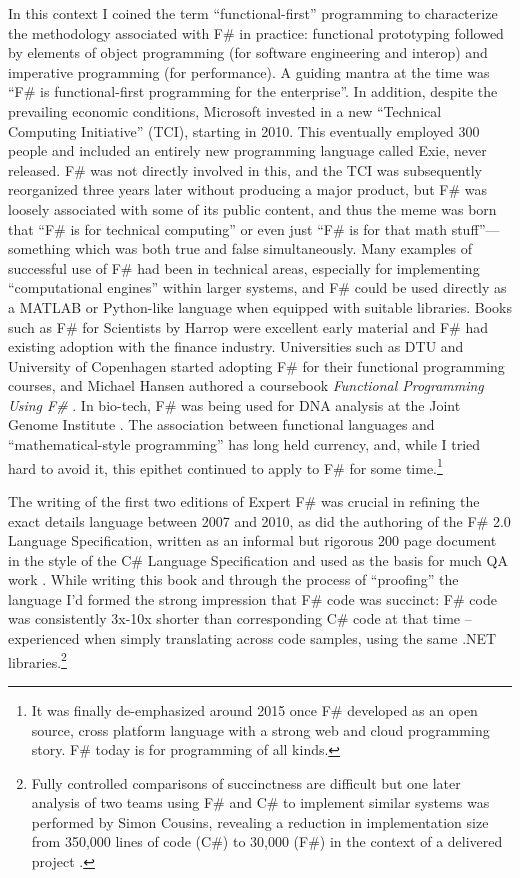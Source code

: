 \documentclass[acmsmall,screen]{acmart}
\begin{document}
In this context I coined the term “functional-first” programming to characterize the methodology associated with F\# in practice: functional prototyping
followed by elements of object programming (for software engineering and interop) and imperative programming (for performance). A guiding mantra
at the time was “F\# is functional-first programming for the enterprise”.  In addition, despite the prevailing economic conditions, Microsoft invested in a
new “Technical Computing Initiative” (TCI), starting in 2010. This eventually employed 300 people and included an entirely new programming language
called Exie, never released.  F\# was not directly involved in this, and the TCI was subsequently reorganized three years later without producing a major
product, but F\# was loosely associated with some of its public content, and thus the meme was born that “F\# is for technical computing” or even
just “F\# is for that math stuff”---something which was both true and false simultaneously. Many examples of successful use of F\# had been in
technical areas, especially for implementing “computational engines” within larger systems, and F\# could be used directly as a MATLAB or Python-like
language when equipped with suitable libraries.  Books such as F\# for Scientists by Harrop were excellent early material and F\# had existing adoption
with the finance industry. Universities such as DTU and University of Copenhagen started adopting F\# for their functional programming courses,
and Michael Hansen authored a coursebook \textit{Functional Programming Using F\#} \citep{Hansen2011}.
In bio-tech, F\# was being used for DNA analysis at the Joint Genome
Institute \citep{RefNeanderthals}.  The association between functional languages and
“mathematical-style programming” has long held currency, and, while I tried hard to avoid it, this epithet continued to
apply to F\# for some time.\footnote{It was finally de-emphasized around 2015 once F\# developed as an open source, cross
platform language with a strong web and cloud programming story. F\# today is for programming of all kinds.}

\label{page:fsharp-succinct}

The writing of the first two editions of Expert F\# was crucial in refining the exact details language between 2007 and 2010, as did the
authoring of the F\# 2.0 Language Specification, written as an informal but rigorous 200 page document in
the style of the C\# Language Specification and used as the basis for much QA work \citep{RefLangSpec}.
While writing this book and through the process of ``proofing'' the language I'd formed the strong impression that F\# code was succinct: F\# code was consistently
3x-10x shorter than corresponding C\# code at that time -- experienced when simply translating across code samples, using the same .NET libraries.\footnote{Fully
controlled comparisons of succinctness are difficult but one later analysis of two teams using F\# and C\# to implement similar systems was performed
by Simon Cousins, revealing a reduction in implementation size from 350,000 lines of code (C\#) to 30,000 (F\#) in the context of a delivered
project \citep{RefLangDiff}.}
\end{document}
